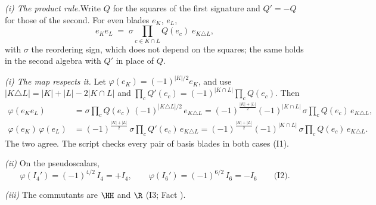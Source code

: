 \textit{(i) The product rule.}\enspace Write $Q$ for the squares of the first signature and $Q' = -Q$ for those of the second. For even blades $e_{K}$, $e_{L}$,
\[
e_{K}e_{L} \;=\; \sigma \prod_{c \in K \cap L}Q(e_{c})\;e_{K \triangle L},
\]
with $\sigma$ the reordering sign, which does not depend on the squares; the same holds in the second algebra with $Q'$ in place of $Q$.



\emph{(i) The map respects it.}  Let $\varphi(e_{K}) = (-1)^{|K|/2}e_{K}$, and use $|K \triangle L| = |K| + |L| - 2|K \cap L|$ and $\prod_{c}Q'(e_{c}) = (-1)^{|K \cap L|}\prod_{c}Q(e_{c})$. Then
\begin{align*}
\varphi(e_{K}e_{L}) &= \sigma\prod_{c}Q(e_{c})\,(-1)^{|K \triangle L|/2}\,e_{K \triangle L}
= (-1)^{\frac{|K|+|L|}{2}}(-1)^{|K \cap L|}\,\sigma\prod_{c}Q(e_{c})\,e_{K \triangle L}, \\
\varphi(e_{K})\,\varphi(e_{L}) &= (-1)^{\frac{|K|+|L|}{2}}\,\sigma\prod_{c}Q'(e_{c})\,e_{K \triangle L}
= (-1)^{\frac{|K|+|L|}{2}}(-1)^{|K \cap L|}\,\sigma\prod_{c}Q(e_{c})\,e_{K \triangle L}.
\end{align*}
The two agree. The script checks every pair of basis blades in both cases (I1).



\emph{(ii)}  On the pseudoscalars,
\[
\varphi(I_{4}') = (-1)^{4/2}\,I_{4} = +I_{4}, \qquad \varphi(I_{6}') = (-1)^{6/2}\,I_{6} = -I_{6} \qquad \text{(I2)}.
\]



\emph{(iii)}  The commutants are $\HH$ and $\R$ (I3; Fact ).
